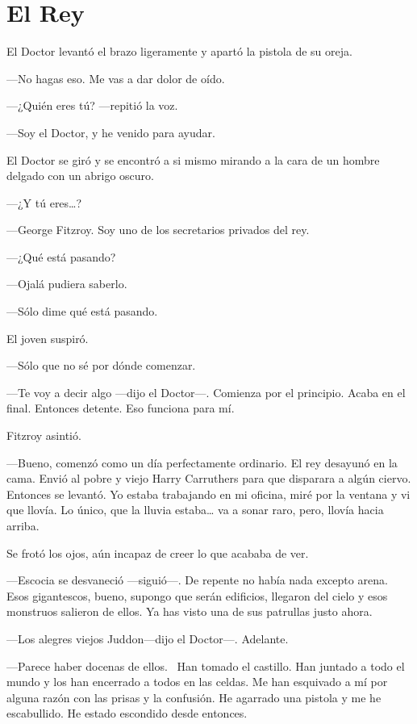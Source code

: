 \chapter*{El Rey}

El Doctor levantó el brazo ligeramente y apartó la pistola de su oreja.

---No hagas eso. Me vas a dar dolor de oído.

---¿Quién eres tú? ---repitió la voz.

---Soy el Doctor, y he venido para ayudar.

El Doctor se giró y se encontró a si mismo mirando a la cara de un
hombre delgado con un abrigo oscuro.

---¿Y tú eres\ldots{}?

---George Fitzroy. Soy uno de los secretarios privados del rey.

---¿Qué está pasando?

---Ojalá pudiera saberlo.

---Sólo dime qué está pasando.

El joven suspiró.

---Sólo que no sé por dónde comenzar.

---Te voy a decir algo ---dijo el Doctor---. Comienza por el principio.
Acaba en el final. Entonces detente. Eso funciona para mí.

Fitzroy asintió.

---Bueno, comenzó como un día perfectamente ordinario. El rey desayunó
en la cama. Envió al pobre y viejo Harry Carruthers para que disparara a
algún ciervo. Entonces se levantó. Yo estaba trabajando en mi oficina,
miré por la ventana y vi que llovía. Lo único, que la lluvia
estaba\ldots{} va a sonar raro, pero, llovía hacia arriba.

Se frotó los ojos, aún incapaz de creer lo que acababa de ver.

---Escocia se desvaneció ---siguió---. De repente no había nada excepto
arena. Esos gigantescos, bueno, supongo que serán edificios, llegaron
del cielo y esos monstruos salieron de ellos. Ya has visto una de sus
patrullas justo ahora.

---Los alegres viejos Juddon---dijo el Doctor---. Adelante.

---Parece haber docenas de ellos. ~Han tomado el castillo. Han juntado a
todo el mundo y los han encerrado a todos en las celdas. Me han
esquivado a mí por alguna razón con las prisas y la confusión. He
agarrado una pistola y me he escabullido. He estado escondido desde
entonces.

